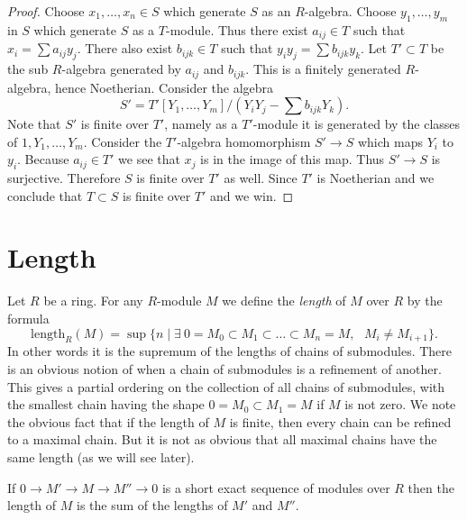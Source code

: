 \begin{proof}
Choose $x_1, \ldots, x_n \in S$ which generate $S$ as an $R$-algebra.
Choose $y_1, \ldots, y_m$ in $S$ which generate $S$ as a $T$-module.
Thus there exist $a_{ij} \in T$ such that
$x_i = \sum a_{ij} y_j$. There also exist $b_{ijk} \in T$ such
that $y_i y_j = \sum b_{ijk} y_k$. Let $T' \subset T$ be the
sub $R$-algebra generated by $a_{ij}$ and $b_{ijk}$. This is a finitely
generated $R$-algebra, hence Noetherian. Consider the algebra
$$
S' = T'[Y_1, \ldots, Y_m]/(Y_i Y_j - \sum b_{ijk} Y_k).
$$
Note that $S'$ is finite over $T'$, namely as a $T'$-module it is
generated by the classes of $1, Y_1, \ldots, Y_m$.
Consider the $T'$-algebra homomorphism $S' \to S$ which maps
$Y_i$ to $y_i$. Because $a_{ij} \in T'$ we see that $x_j$ is
in the image of this map. Thus $S' \to S$ is surjective.
Therefore $S$ is finite over $T'$ as well. Since $T'$ is Noetherian
and we conclude that $T \subset S$ is finite over $T'$ and
we win.
\end{proof}























\section{Length}
\label{section-length}

\noindent
Let $R$ be a ring. For any $R$-module $M$
we define the {\it length} of $M$ over $R$ by the
formula
$$
\text{length}_R(M)
=
\sup
\{
n
\mid
\exists\ 0 = M_0 \subset M_1 \subset \ldots \subset M_n = M,
\text{ }M_i \not= M_{i + 1}
\}.
$$
In other words it is the supremum of the lengths of chains
of submodules. There is an obvious notion of when a chain
of submodules is a refinement of another. This gives a partial
ordering on the collection of all chains of submodules,
with the smallest chain having the shape $0 = M_0 \subset M_1 = M$
if $M$ is not zero.
We note the obvious fact that if the length of
$M$ is finite, then every chain can be refined to a
maximal chain. But it is not as obvious that all maximal
chains have the same length (as we will see later).

\begin{lemma}
\label{lemma-length-additive}
If $0 \to M' \to M \to M'' \to 0$
is a short exact sequence of modules over $R$ then
the length of $M$ is the sum of the
lengths of $M'$ and $M''$.
\end{lemma}

